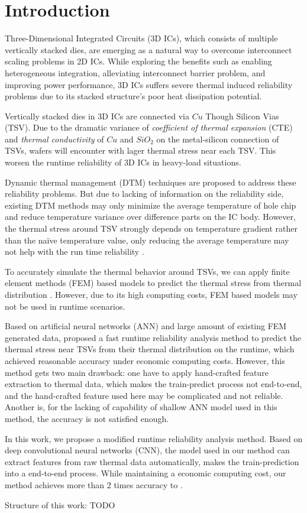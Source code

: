 
\chapter{Introduction}

Three-Dimensional Integrated Circuits (3D ICs),
which consists of multiple vertically stacked dies, 
are emerging as a natural way to overcome interconnect scaling problems in 2D ICs.
While exploring the benefits such as enabling heterogeneous integration, 
alleviating interconnect barrier problem, and improving power performance, 
3D ICs suffers severe thermal induced reliability problems due to its
stacked structure's poor heat dissipation potential.

Vertically stacked dies in 3D ICs are connected via $Cu$ Though Silicon Vias (TSV)\cite{Beyne2008Through}. 
Due to the dramatic variance of 
\textit{coefficient of thermal expansion} (CTE) and \textit{thermal conductivity}
of $Cu$ and $SiO_2$ on the metal-silicon connection of TSVs, 
wafers will encounter with lager thermal stress near each TSV.
This worsen the runtime reliability of 3D ICs in heavy-load situations.

Dynamic thermal management (DTM) techniques are proposed to address these reliability
problems. But due to lacking of information on the reliability side, existing DTM 
methods may only minimize the average temperature of hole chip and reduce temperature
variance over difference parts on the IC body\cite{Zou2013Thermomechanical}.
However, the thermal stress around TSV strongly depends on temperature gradient rather
than the na\"ive temperature value, only reducing the average temperature may not help with
the run time reliability \cite{Zhang2016Fast}.

To accurately simulate the thermal behavior around TSVs, we can apply finite element methods (FEM)
based models to predict the thermal stress from thermal distribution \cite{Lu2009Thermo}. 
However, due to its high computing costs, FEM based models may not be used in runtime scenarios.

Based on artificial neural networks (ANN) and large amount of existing FEM generated data, 
\cite{Zhang2016Fast} proposed a fast runtime reliability analysis method to predict the 
thermal stress near TSVs from their thermal distribution on the
runtime, which achieved reasonable accuracy under economic computing costs.
However, this method gets two main drawback: one have to apply hand-crafted feature extraction to
thermal data, which makes the train-predict process not end-to-end, and the hand-crafted feature used here
may be complicated and not reliable. Another is, 
for the lacking of capability of shallow ANN model used in this method, 
the accuracy is not satisfied enough.

In this work, we propose a modified runtime reliability analysis method.
Based on deep convolutional neural networks (CNN), the model used in our method can extract features from raw
thermal data automatically, makes the train-prediction into a end-to-end process.
While maintaining a economic computing cost, our method achieves more than 2 times accuracy to \cite{Zhang2016Fast}.

Structure of this work: TODO

